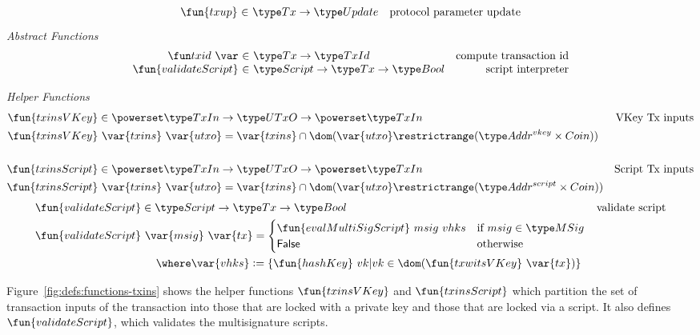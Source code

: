 \begin{figure*}[htb]
\begin{equation*}
\begin{array}{r@{~\in~}lr}
      \fun{txup} & \Tx \to \Update & \text{protocol parameter update}
    \end{array}
  \end{equation*}
  \emph{Abstract Functions}
  \begin{equation*}
    \begin{array}{r@{~\in~}lr}
      \txid{} & \Tx \to \TxId & \text{compute transaction id}\\
      \fun{validateScript} & \Script \to \Tx \to \Bool & \text{script interpreter}
    \end{array}
  \end{equation*}
  \caption{Definitions used in the UTxO transition system}
  \label{fig:defs:utxo-shelley}
\end{figure*}

\begin{figure*}[htb]
  \emph{Helper Functions}
  \begin{align*}
    \fun{txinsVKey} & \in \powerset \TxIn \to \UTxO \to \powerset\TxIn & \text{VKey Tx inputs}\\
    \fun{txinsVKey} & ~\var{txins}~\var{utxo} =
    \var{txins} \cap \dom (\var{utxo} \restrictrange (\AddrVKey \times Coin))
    \\
    \\
    \fun{txinsScript} & \in \powerset \TxIn \to \UTxO \to \powerset\TxIn & \text{Script Tx inputs}\\
    \fun{txinsScript} & ~\var{txins}~\var{utxo} =
                        \var{txins} \cap \dom (\var{utxo} \restrictrange (\AddrScr \times Coin))
  \end{align*}
  \begin{align*}
    \fun{validateScript} & \in\Script\to\Tx\to\Bool & \text{validate
                                                      script} \\
    \fun{validateScript} & ~\var{msig}~\var{tx}=
                           \begin{cases}
                             \fun{evalMultiSigScript}~msig~vhks & \text{if}~msig \in\MSig \\
                             \mathsf{False} & \text{otherwise}
                           \end{cases} \\
                         & ~~~~\where \var{vhks}\leteq \{\fun{hashKey}~vk \vert
                           vk \in \dom(\fun{txwitsVKey}~\var{tx})\}
  \end{align*}
  \caption{Helper Functions for Transaction Inputs}
  \label{fig:defs:functions-txins}
\end{figure*}

Figure~\ref{fig:defs:functions-txins} shows the helper functions
$\fun{txinsVKey}$ and $\fun{txinsScript}$ which partition the set of transaction
inputs of the transaction into those that are locked with a private key and
those that are locked via a script.
It also defines $\fun{validateScript}$, which validates the multisignature scripts.

\clearpage

